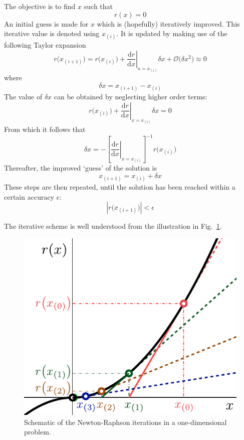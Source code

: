 \documentclass[times,namecite]{goose-article}
\begin{document}
The objective is to find $x$ such that
\begin{equation}
  r(x) = 0
\end{equation}
An initial guess is made for $x$ which is (hopefully) iteratively improved. This iterative value is denoted using $x_{(i)}$. It is updated by making use of the following Taylor expansion
\begin{equation}
  r \big( x_{(i+1)} \big)
  =
  r \big( x_{(i)} \big)
  +
  \left. \frac{\mathrm{d} r}{\mathrm{d} x} \right|_{x = x_{(i)}} \delta x
  +
  \mathcal{O} \big( \delta x^2 \big)
  \approx
  0
\end{equation}
where
\begin{equation}
  \delta x = x_{(i+1)} - x_{(i)}
\end{equation}
The value of $\delta x$ can be obtained by neglecting higher order terms:
\begin{equation}
  r \big( x_{(i)} \big)
  +
  \left. \frac{\mathrm{d} r}{\mathrm{d} x} \right|_{x = x_{(i)}} \delta x
  =
  0
\end{equation}
From which it follows that
\begin{equation}
  \delta x
  =
  - \left[ \left. \frac{\mathrm{d} r}{\mathrm{d} x} \right|_{x = x_{(i)}} \right]^{-1}
  r \big( x_{(i)} \big)
\end{equation}
Thereafter, the improved `guess' of the solution is
\begin{equation}
  x_{(i+1)} = x_{(i)} + \delta x
\end{equation}
These steps are then repeated, until the solution has been reached within a certain accuracy $\epsilon$:
\begin{equation}
  \left| r \big( x_{(i+1)} \big) \right| < \epsilon
\end{equation}

The iterative scheme is well understood from the illustration in Fig.~\ref{fig:newton-raphson}.

\begin{figure}[htp]
  \centering
  \includegraphics[width=.3\textwidth]{figures/newton-raphson.pdf}
  \caption{Schematic of the Newton-Raphson iterations in a one-dimensional problem.}
  \label{fig:newton-raphson}
\end{figure}





% 
\end{document}
